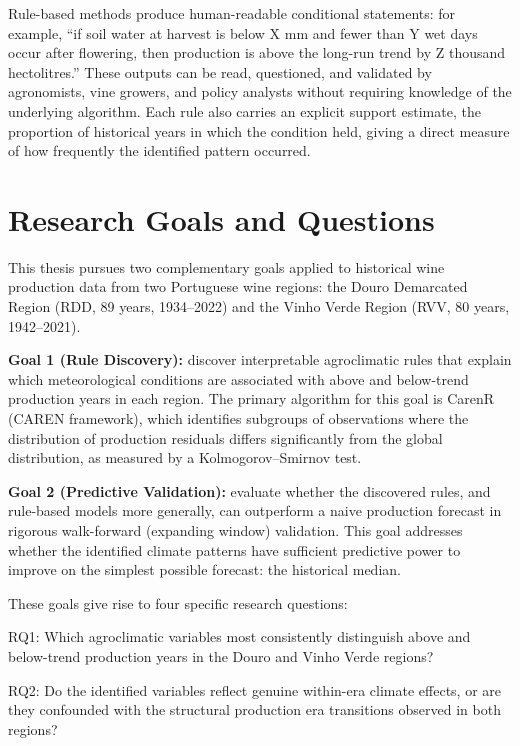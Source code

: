 Rule-based methods produce human-readable conditional statements: for example, ``if soil water at harvest is below X mm and fewer than Y wet days occur after flowering, then production is above the long-run trend by Z thousand hectolitres.'' These outputs can be read, questioned, and validated by agronomists, vine growers, and policy analysts without requiring knowledge of the underlying algorithm. Each rule also carries an explicit support estimate, the proportion of historical years in which the condition held, giving a direct measure of how frequently the identified pattern occurred.


\section{Research Goals and Questions}\label{sec:research_goals_and_questions}

This thesis pursues two complementary goals applied to historical wine production data from two Portuguese wine regions: the Douro Demarcated Region (RDD, 89 years, 1934--2022) and the Vinho Verde Region (RVV, 80 years, 1942--2021).

\textbf{Goal 1 (Rule Discovery): }discover interpretable agroclimatic rules that explain which meteorological conditions are associated with above and below-trend production years in each region. The primary algorithm for this goal is CarenR (CAREN framework), which identifies subgroups of observations where the distribution of production residuals differs significantly from the global distribution, as measured by a Kolmogorov--Smirnov test.

\textbf{Goal 2 (Predictive Validation): }evaluate whether the discovered rules, and rule-based models more generally, can outperform a naive production forecast in rigorous walk-forward (expanding window) validation. This goal addresses whether the identified climate patterns have sufficient predictive power to improve on the simplest possible forecast: the historical median.

These goals give rise to four specific research questions:

\textbullet{}  RQ1: Which agroclimatic variables most consistently distinguish above and below-trend production years in the Douro and Vinho Verde regions?

\textbullet{}  RQ2: Do the identified variables reflect genuine within-era climate effects, or are they confounded with the structural production era transitions observed in both regions?

